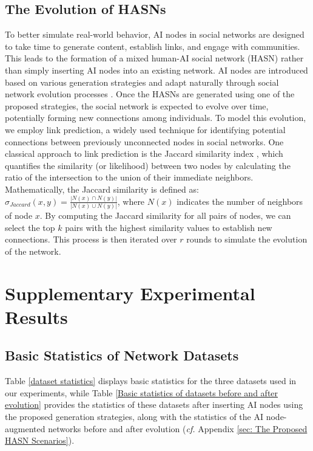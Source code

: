 \subsection{The Evolution of HASNs}
\label{sec: The Evolution of HASNs}
To better simulate real-world behavior, AI nodes in social networks are designed to take time to generate content, establish links, and engage with communities. This leads to the formation of a mixed human-AI social network (HASN) rather than simply inserting AI nodes into an existing network. AI nodes are introduced based on various generation strategies and adapt naturally through social network evolution processes \cite{mcpherson2001birds}\cite{daud2020applications}.
Once the HASNs are generated using one of the proposed strategies, the social network is expected to evolve over time, potentially forming new connections among individuals. To model this evolution, we employ link prediction, a widely used technique for identifying potential connections between previously unconnected nodes in social networks. One classical approach to link prediction is the Jaccard similarity index \cite{arrar2024comprehensive}\cite{daud2020applications}, which quantifies the similarity (or likelihood) between two nodes by calculating the ratio of the intersection to the union of their immediate neighbors. Mathematically, the Jaccard similarity is defined as: $\sigma_{Jaccard}(x,y) = \frac{|N(x) \cap N(y)|}{|N(x) \cup N(y)|}$, where $N(x)$ indicates the number of neighbors of node $x$. By computing the Jaccard similarity for all pairs of nodes, we can select the top $k$ pairs with the highest similarity values to establish new connections. This process is then iterated over $r$ rounds to simulate the evolution of the network.


\section{Supplementary Experimental Results}
\label{sec: Supplementary Experimental Results}

\subsection{Basic Statistics of Network Datasets}
\label{sec: Basic Statistics of Network Datasets}
Table \ref{dataset statistics} displays basic statistics for the three datasets used in our experiments, while Table \ref{Basic statistics of datasets before and after evolution} provides the statistics of these datasets after inserting AI nodes using the proposed generation strategies, along with the statistics of the AI node-augmented networks before and after evolution (\textit{cf.} Appendix \ref{sec: The Proposed HASN Scenarios}).

